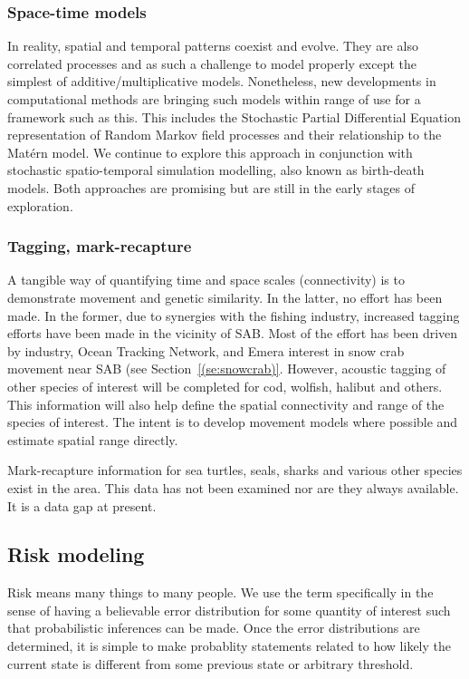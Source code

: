 \documentclass[letterpaper,portrait,11pt]{scrartcl}
\numberwithin{equation}{section}		%
\numberwithin{figure}{section}		%
\numberwithin{table}{section}				%
\begin{document}
\subsubsection{Space-time models}

In reality, spatial and temporal patterns coexist and evolve. They are also correlated processes and as such a challenge to model properly except the simplest of additive/multiplicative models. Nonetheless, new developments in computational methods are bringing such models within range of use for a framework such as this. This includes the Stochastic Partial Differential Equation representation of Random Markov field processes and their relationship to the Mat\'{e}rn model. We continue to explore this approach in conjunction with stochastic spatio-temporal simulation modelling, also known as birth-death models. Both approaches are promising but are still in the early stages of exploration.


\subsubsection{Tagging, mark-recapture}

A tangible way of quantifying time and space scales (connectivity) is to demonstrate movement and genetic similarity. In the latter, no effort has been made.  In the former, due to synergies with the fishing industry, increased tagging efforts have been made in the vicinity of SAB. Most of the effort has been driven by industry, Ocean Tracking Network, and Emera interest in snow crab movement near SAB (see Section~\ref{(se:snowcrab)}. However, acoustic tagging of other species of interest will be completed for cod, wolfish, halibut and others. This information will also help define the spatial connectivity and range of the species of interest. The intent is to develop movement models where possible and estimate spatial range directly.  

Mark-recapture information for sea turtles, seals, sharks and various other species exist in the area. This data has not been examined nor are they always available. It is a data gap at present. 


\subsection{Risk modeling}
\label{sec:riskapproach}

Risk means many things to many people. We use the term specifically in the sense of having a believable error distribution for some quantity of interest such that probabilistic inferences can be made. Once the error distributions are determined, it is simple to make probablity statements related to how likely the current state is different from some previous state or arbitrary threshold. 
\end{document}
